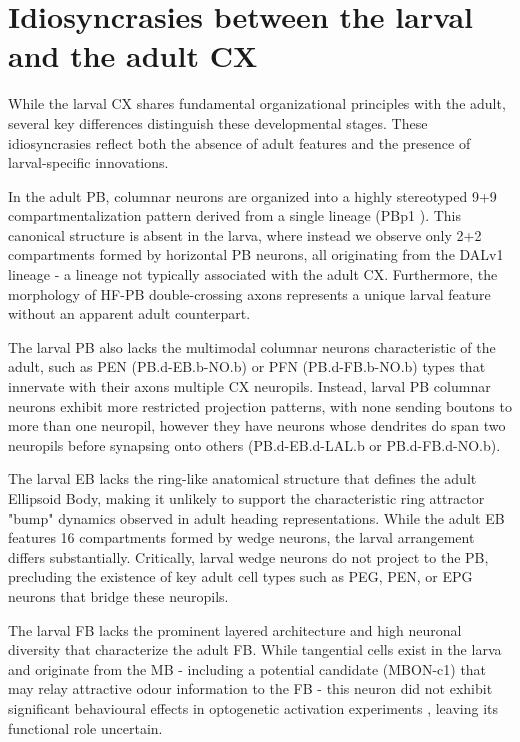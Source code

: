        

\section{Idiosyncrasies between the larval and the adult CX}
While the larval CX shares fundamental organizational principles with the adult, several key differences distinguish these developmental stages. These idiosyncrasies reflect both the absence of adult features and the presence of larval-specific innovations.


In the adult PB, columnar neurons are organized into a highly stereotyped 9+9 compartmentalization pattern derived from a single lineage (PBp1 \citep{andrade2019developmentally}). This canonical structure is absent in the larva, where instead we observe only 2+2 compartments formed by horizontal PB neurons, all originating from the DALv1 lineage - a lineage not typically associated with the adult CX. Furthermore, the morphology of HF-PB double-crossing axons represents a unique larval feature without an apparent adult counterpart.

The larval PB also lacks the multimodal columnar neurons characteristic of the adult, such as PEN (PB.d-EB.b-NO.b) or PFN (PB.d-FB.b-NO.b) types that innervate with their axons multiple CX neuropils. Instead, larval PB columnar neurons exhibit more restricted projection patterns, with none sending boutons to more than one neuropil, however they have neurons whose dendrites do span two neuropils before synapsing onto others (PB.d-EB.d-LAL.b or PB.d-FB.d-NO.b). 

The larval EB lacks the ring-like anatomical structure that defines the adult Ellipsoid Body, making it unlikely to support the characteristic ring attractor "bump" dynamics observed in adult heading representations. While the adult EB features 16 compartments formed by wedge neurons, the larval arrangement differs substantially. Critically, larval wedge neurons do not project to the PB, precluding the existence of key adult cell types such as PEG, PEN, or EPG neurons that bridge these neuropils. 


The larval FB lacks the prominent layered architecture and high neuronal diversity that characterize the adult FB. While tangential cells exist in the larva and originate from the MB - including a potential candidate (MBON-c1) that may relay attractive odour information to the FB - this neuron did not exhibit significant behavioural effects in optogenetic activation experiments \citep{eschbach2020recurrent}, leaving its functional role uncertain.

